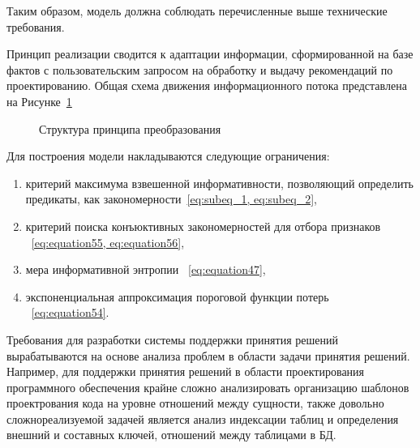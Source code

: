 Таким образом, модель должна соблюдать перечисленные выше технические требования.

Принцип реализации сводится к адаптации информации, сформированной на базе фактов с пользовательским запросом на обработку и выдачу рекомендаций по проектированию. Общая схема движения информационного потока представлена на Рисунке~\cref{fig:Dataflow} 

\begin{figure}[ht]
    \caption{Структура принципа преобразования}\label{fig:Dataflow}
\end{figure}
Для построения модели накладываются следующие ограничения:
\begin{enumerate}
	\item критерий максимума взвешенной информативности, позволяющий определить предикаты, как закономерности~\cref{eq:subeq_1, eq:subeq_2},
	\item критерий поиска конъюктивных закономерностей для отбора признаков ~\cref{eq:equation55, eq:equation56},
	\item мера информативной энтропии ~\cref{eq:equation47},
	\item экспоненциальная аппроксимация пороговой функции потерь ~\cref{eq:equation54}.
\end{enumerate}

Требования для разработки системы поддержки принятия решений вырабатываются на основе анализа проблем в области задачи принятия решений. Например, для поддержки принятия решений в области проектирования программного обеспечения крайне сложно анализировать организацию шаблонов проектрования кода на уровне отношений между сущности, также довольно сложнореализуемой задачей является анализ индексации таблиц и определения внешний и составных ключей, отношений между таблицами в БД.

